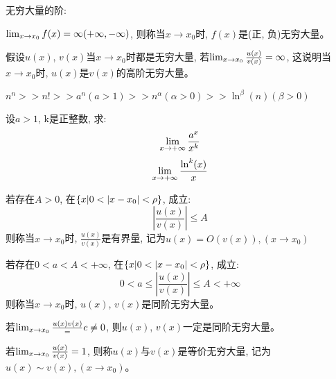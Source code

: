 无穷大量的阶: 

$\lim_{x \to x_0 } f(x) = \infty (+\infty, -\infty)$, 则称当$x \to x_0$时, $f(x)$是(正, 负)无穷大量。

\begin{definition}
    假设$u(x)$, $v(x)$当$x \to x_0$时都是无穷大量, 若$\lim_{x \to x_0 } \frac{u(x)}{v(x)} = \infty$, 这说明当$x \to x_0$时, $u(x)$是$v(x)$的高阶无穷大量。
\end{definition}

$n^n >> n! >> a^n(a > 1) >> n^\alpha(\alpha > 0) >> \ln^\beta(n)(\beta > 0)$

\begin{proposition}
    设$a > 1$, k是正整数, 求: 
    \[ \lim_{x \to +\infty } \frac{a^x}{x^k} \]
    \[ \lim_{x \to +\infty } \frac{\ln^k(x)}{x}\]
\end{proposition}
\begin{definition}
    若存在$A > 0$, 在$\left\{ x | 0 < \left| x - x_0\right| < \rho\right\}$, 成立:
    \[ \left| \frac{u(x)}{v(x)} \right| \le A \]
    则称当$x \to x_0$时, $\frac{u(x)}{v(x)}$是有界量, 记为$u(x) = O(v(x)), (x \to x_0)$
\end{definition}

\begin{definition}
    若存在$0 < a < A < +\infty$, 在$\left\{ x | 0 < \left| x - x_0\right| < \rho\right\}$, 成立:
    \[ 0 < a \le \left| \frac{u(x)}{v(x)} \right| \le A < +\infty \]
    则称当$x \to x_0$时, $u(x)$, $v(x)$是同阶无穷大量。
\end{definition}
若$\lim_{x \to x_0 } \frac{u(x){v(x)}} = c \neq 0$, 则$u(x)$, $v(x)$一定是同阶无穷大量。
\begin{definition}
    若$\lim_{x \to x_0 } \frac{u(x)}{v(x)} = 1$, 则称$u(x)$与$v(x)$是等价无穷大量, 记为$u(x) \sim v(x), (x \to x_0)$。
\end{definition}

